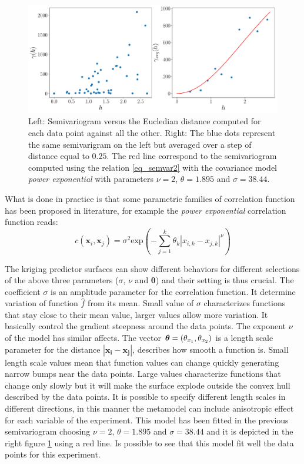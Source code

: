 \begin{figure}[ht]
	\centering
	\includegraphics[width=0.9\linewidth]{appendix_a/sem}
	\caption{Left: Semivariogram versus the Eucledian distance computed for each data point against all the other.  Right: The blue dots represent the same semivarigram on the left but averaged over a step of distance equal to $0.25$. The red line correspond to the semivariogram computed using the relation \eqref{eq_semvar2} with the covariance model \textit{power exponential} with parameters $\nu=2$, $\theta=1.895$ and $\sigma=38.44$.}
	\label{fig:semivariogram}
\end{figure}

What is done in practice is that some parametric families of correlation function has been proposed in literature, for example the \textit{power exponential} correlation function reads:
\begin{equation}
c(\mathbf{x}_{i} , \mathbf{x}_{j})  = \sigma^2 \textrm{exp}\left( -\sum_{j=1}^{k} \theta_k {|{x}_{i,k} - {x}_{j,k} |}^\nu \right)
\end{equation}

The kriging predictor surfaces can show different behaviors for different selections of the above three parameters ($\sigma$, $\nu$ and $\boldsymbol{\theta}$) and their setting is thus crucial.
The coefficient $\sigma$ is an amplitude parameter for the correlation function. It determine variation of function $\hat{f}$ from its mean. Small value of $\sigma$ characterizes functions that stay close to their mean value, larger values allow more variation. It basically control the gradient steepness around the data points. The exponent $\nu$ of the model has similar affects.
The vector $\boldsymbol{\theta}=(\theta_{x_1}, \theta_{x_2})$ is a length scale parameter for the distance $|\mathbf{x_i} - \mathbf{x_j}|$, describes how smooth a function is. Small length scale values mean that function values can change quickly generating narrow bumps near the data points. Large values characterize functions that change only slowly but it will make the surface explode outside the convex hull described by the data points. It is possible to specify different length scales in different directions, in this manner the metamodel can include anisotropic effect for each variable of the experiment.
This model has been fitted in the previous semivariogram choosing $\nu=2$, $\theta=1.895$ and $\sigma=38.44$ and it is depicted in the right figure \ref{fig:semivariogram} using a red line. Is possible to see that this model fit well the data points for this experiment.

